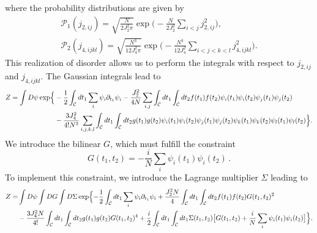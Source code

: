 \documentclass[prx,aps,onecolumn,amsfonts,showpacs,superscriptaddress,preprint,eqsecnum]
{revtex4-1}
\begin{document}
where the probability distributions are given by
\begin{gather}
\mathcal{P}_{1}(j_{2,ij})=\sqrt{\frac{N}{2J_2^{2}\pi}}\operatorname{exp}
\Big(-\frac { N } { 2J_2^ { 2
}}\sum_{i<j}j_{2,ij}^{2}\Big),\\
\mathcal{P}_{2}(j_{4,ijkl})=\sqrt{\frac{N^{3}}{12J_4^{2}\pi}}\operatorname{exp}
\Big(-\frac {N^{3}}{12J_4^{2}}\sum_{i<j<k<l}j^{2}_{4,ijkl}\Big).
\end{gather}
This realization of disorder allows us to perform the integrals with respect to $j_{2,ij}$ and 
$j_{4,ijkl}$. The Gaussian integrals lead to
\begin{equation}
\begin{split}
 Z = \int D\psi \operatorname{exp}\Bigl\{&-\frac{1}{2}\int_{\mathcal C} dt_1 
\sum_i \psi_i \partial_{t_1} \psi_i - \frac{J_2^2}{4N} \sum_{i,j} \int_{\mathcal C} 
dt_1 \int_{\mathcal C} dt_2 f(t_1) f(t_2)\psi_i(t_1) \psi_i(t_2) \psi_j(t_1) \psi_j(t_2)\\
	&- \frac{3 J_4^2}{4! N^3} \sum_{i,j,k,l} \int_{\mathcal C} dt_1 \int_{\mathcal 
C} dt_2 g(t_1) g(t_2) \psi_i(t_1) \psi_i(t_2) \psi_j(t_1) \psi_j(t_2) \psi_k(t_1) 
\psi_k(t_2) \psi_l(t_1) \psi_l(t_2)\Bigr\}. \nonumber
\end{split} 
\end{equation}
We introduce the bilinear $G$, which must fulfill the constraint
\begin{equation}
	G(t_1, t_2) = - \frac{i}{N}\sum_i \psi_i(t_1) \psi_i(t_2) \,.
\end{equation}
To implement this constraint, we introduce the Lagrange multiplier $\Sigma$ leading to
\begin{equation}
\begin{split}
	Z=&\int D\psi \int DG \int D\Sigma \operatorname{exp}\Bigl\{-\frac{1}{2} 
\int_{\mathcal C} dt_1 \sum_i \psi_i \partial_{t_1} \psi_i + \frac{J_2^2 N}{4} 
\int_{\mathcal C} dt_1 \int_{\mathcal C} dt_2 f(t_1) f(t_2) G(t_1, t_2)^2\\
&-\frac{3 J_4^2 N}{4!} \int_{\mathcal C} dt_1 \int_{\mathcal C} dt_2 g(t_1) 
g(t_2) G(t_1, t_2)^4 + \frac{i}{2} \int_{\mathcal C} dt_1 \int_{\mathcal C} dt_1 
\Sigma(t_1, t_2) \bigl[G(t_1, t_2) + \frac{i}{N} \sum_i \psi_i(t_1) 
\psi_i(t_2)\bigr]\Bigr\}.\nonumber
\end{split}
\end{equation}
\end{document}
